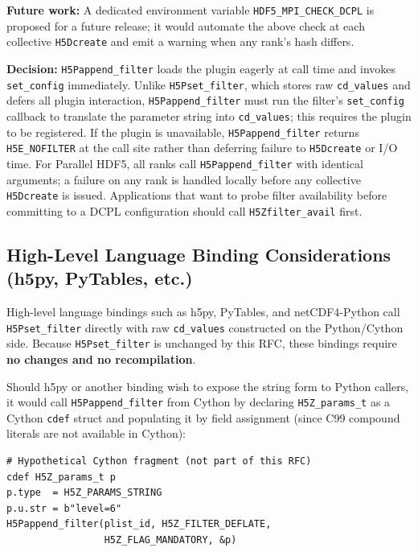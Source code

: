 \documentclass[../RFC-HDFG-2026-001.tex]{subfiles}
\begin{document}
\textbf{Future work:} A dedicated environment variable
\texttt{HDF5\_MPI\_CHECK\_DCPL} is proposed for a future release; it would
automate the above check at each collective \texttt{H5Dcreate} and emit a
warning when any rank's hash differs.


\noindent\textbf{Decision:} \texttt{H5Pappend\_filter} loads the plugin
eagerly at call time and invokes \texttt{set\_config} immediately.  Unlike
\texttt{H5Pset\_filter}, which stores raw \texttt{cd\_values} and defers
all plugin interaction, \texttt{H5Pappend\_filter} must run the filter's
\texttt{set\_config} callback to translate the parameter string into
\texttt{cd\_values}; this requires the plugin to be registered.  If the
plugin is unavailable, \texttt{H5Pappend\_filter} returns \texttt{H5E\_NOFILTER}
at the call site rather than deferring failure to \texttt{H5Dcreate} or
I/O time.  For Parallel HDF5, all ranks call \texttt{H5Pappend\_filter}
with identical arguments; a failure on any rank is handled locally before
any collective \texttt{H5Dcreate} is issued.  Applications that want to
probe filter availability before committing to a DCPL configuration should
call \texttt{H5Zfilter\_avail} first.

\subsection{High-Level Language Binding Considerations (h5py, PyTables, etc.)}
\label{sec:hll-bindings}

High-level language bindings such as h5py, PyTables, and netCDF4-Python
call \texttt{H5Pset\_filter} directly with raw \texttt{cd\_values} constructed
on the Python/Cython side.  Because \texttt{H5Pset\_filter} is unchanged by
this RFC, these bindings require \textbf{no changes and no recompilation}.

Should h5py or another binding wish to expose the string form to Python
callers, it would call \texttt{H5Pappend\_filter} from Cython by
declaring \texttt{H5Z\_params\_t} as a Cython \texttt{cdef} struct and
populating it by field assignment (since C99 compound literals are not
available in Cython):

\begin{verbatim}
# Hypothetical Cython fragment (not part of this RFC)
cdef H5Z_params_t p
p.type  = H5Z_PARAMS_STRING
p.u.str = b"level=6"
H5Pappend_filter(plist_id, H5Z_FILTER_DEFLATE,
                 H5Z_FLAG_MANDATORY, &p)
\end{verbatim}
\end{document}
